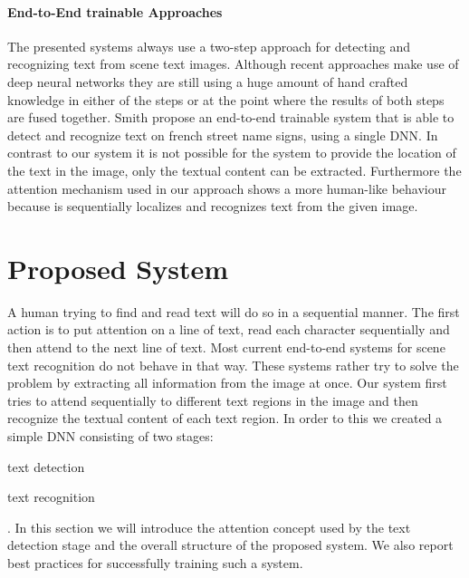 \documentclass[10pt,twocolumn,letterpaper]{article}
\begin{document}
\paragraph{End-to-End trainable Approaches}
	The presented systems always use a two-step approach for detecting and recognizing text from scene text images.
	Although recent approaches make use of deep neural networks they are still using a huge amount of hand crafted knowledge in either of the steps or at the point where the results of both steps are fused together.
	Smith \etal \cite{Smith2016EndToEnd} propose an end-to-end trainable system that is able to detect and recognize text on french street name signs, using a single \ac{DNN}.
	In contrast to our system it is not possible for the system to provide the location of the text in the image, only the textual content can be extracted.
	Furthermore the attention mechanism used in our approach shows a more human-like behaviour because is sequentially localizes and recognizes text from the given image.










 
	\section{Proposed System}
\label{sec:proposed_system}

A human trying to find and read text will do so in a sequential manner. The first action is to put attention on a line of text, read each character sequentially and then attend to the next line of text.
Most current end-to-end systems for scene text recognition do not behave in that way.
These systems rather try to solve the problem by extracting all information from the image at once.
Our system first tries to attend sequentially to different text regions in the image and then recognize the textual content of each text region.
In order to this we created a simple \ac{DNN} consisting of two stages:
\begin{enumerate*}[label={(\arabic*)}]
	\item text detection
	\item text recognition
\end{enumerate*}.
In this section we will introduce the attention concept used by the text detection stage and the overall structure of the proposed system.
We also report best practices for successfully training such a system.
\end{document}
